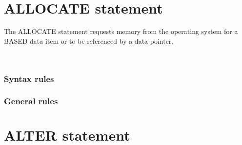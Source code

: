 \section{ALLOCATE statement}

The ALLOCATE statement requests memory from the operating system for a BASED data item or to be referenced by a data-pointer.

\begin{syntax}
  \begin{1=}
    \identifier
    \begin{0-1}
    \end{0-1} \\
    \arithmeticexpression
    \begin{0-1}
    \end{0-1}
  \end{1=}


  \begin{0-1}
     \identifier
  \end{0-1}
\end{syntax}

\subsubsection{Syntax rules}

\subsubsection{General rules}

\section{ALTER statement}

